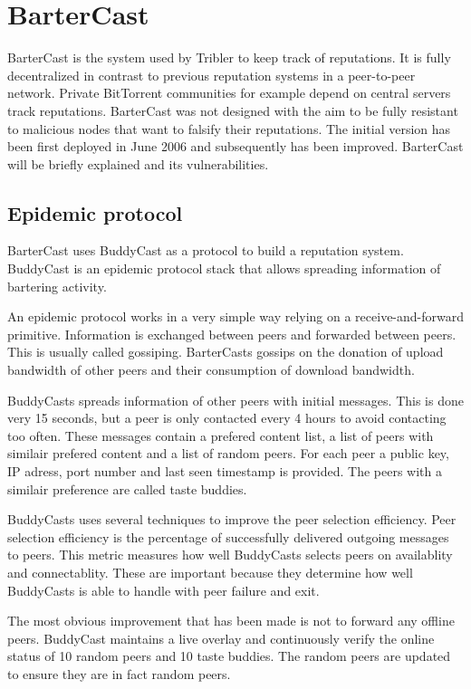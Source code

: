 \section{BarterCast}
BarterCast is the system used by Tribler to keep track of reputations\cite{pouwelse-buddycast}\cite{meulpolder-bartercast}.
It is fully decentralized in contrast to previous reputation systems in a peer-to-peer network.
Private BitTorrent communities for example depend on central servers track reputations.
BarterCast was not designed with the aim to be fully resistant to malicious nodes
that want to falsify their reputations.
The initial version has been first deployed in June 2006
and subsequently has been improved.
BarterCast will be briefly explained and its vulnerabilities.

\subsection{Epidemic protocol}
BarterCast uses BuddyCast as a protocol to build a reputation system.
BuddyCast is an epidemic protocol stack that allows spreading information of bartering activity.

An epidemic protocol works in a very simple way relying on a receive-and-forward primitive.
Information is exchanged between peers and forwarded between peers.
This is usually called gossiping.
BarterCasts gossips on the donation of upload bandwidth of other peers
and their consumption of download bandwidth.

BuddyCasts spreads information of other peers with initial messages.
This is done very 15 seconds, but a peer is only contacted every 4 hours to avoid contacting too often.
These messages contain a prefered content list, a list of peers with similair prefered content
and a list of random peers.
For each peer a public key, IP adress, port number and last seen timestamp is provided.
The peers with a similair preference are called taste buddies.

BuddyCasts uses several techniques to improve the peer selection efficiency.
Peer selection efficiency is the percentage of successfully delivered outgoing messages to peers.
This metric measures how well BuddyCasts selects peers on availablity and connectablity.
These are important because they determine how well BuddyCasts is able to handle with peer failure and exit.

The most obvious improvement that has been made is not to forward any offline peers.
BuddyCast maintains a live overlay
and continuously verify the online status of 10 random peers and 10 taste buddies.
The random peers are updated to ensure they are in fact random peers.

